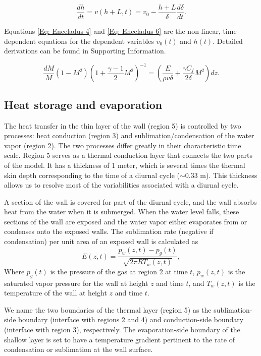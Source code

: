 \documentclass[draft]{agujournal2019}
\begin{document}
\begin{refsection}
\begin{equation}
    \frac{dh}{dt} = v(h+L,t) = v_0 - \frac{h+L}{\delta} \frac{d\delta}{dt}.
\label{Eq: Enceladus-6}
\end{equation}

Equations \ref{Eq: Enceladus-4} and \ref{Eq: Enceladus-6} are the non-linear, time-dependent equations for the dependent variables $v_0(t)$ and $h(t)$. Detailed derivations can be found in Supporting Information.

\begin{equation}
    \frac{dM}{M} (1 - M^2) \left( 1 + \frac{\gamma - 1}{2} M^2 \right)^{-1} = \left( \frac{E}{\rho v \delta} + \frac{\gamma C_f}{2\delta} M^2 \right) dz.
\end{equation}

\subsection{Heat storage and evaporation}
The heat transfer in the thin layer of the wall (region 5) is controlled by two processes: heat conduction (region 3) and sublimation/condensation of the water vapor (region 2). The two processes differ greatly in their characteristic time scale. Region 5 serves as a thermal conduction layer that connects the two parts of the model. It has a thickness of 1 meter, which is several times the thermal skin depth corresponding to the time of a diurnal cycle ($\sim$0.33 m). This thickness allows us to resolve most of the variabilities associated with a diurnal cycle.

A section of the wall is covered for part of the diurnal cycle, and the wall absorbs heat from the water when it is submerged. When the water level falls, these sections of the wall are exposed and the water vapor either evaporates from or condenses onto the exposed walls. The sublimation rate (negative if condensation) per unit area of an exposed wall is calculated as
\begin{equation}
    E(z,t) = \frac{p_w(z,t) - p_g(t)}{\sqrt{2\pi R T_w(z,t)}},
\end{equation}
Where $p_g(t)$ is the pressure of the gas at region 2 at time $t$, $p_w(z,t)$ is the saturated vapor pressure for the wall at height $z$ and time $t$, and $T_w(z,t)$ is the temperature of the wall at height
$z$ and time $t$.

We name the two boundaries of the thermal layer (region 5) as the sublimation-side boundary (interface with regions 2 and 4) and conduction-side boundary (interface with region 3), respectively. The evaporation-side boundary of the shallow layer is set to have a temperature gradient pertinent to the rate of condensation or sublimation at the wall surface.


\end{refsection}
\end{document}
